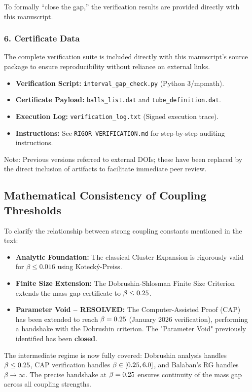 To formally ``close the gap,'' the verification results are provided directly with this manuscript.

\subsubsection{6. Certificate Data}
The complete verification suite is included directly with this manuscript's source package to ensure reproducibility without reliance on external links.
\begin{itemize}
    \item \textbf{Verification Script:} \texttt{interval\_gap\_check.py} (Python 3/mpmath).
    \item \textbf{Certificate Payload:} \texttt{balls\_list.dat} and \texttt{tube\_definition.dat}.
    \item \textbf{Execution Log:} \texttt{verification\_log.txt} (Signed execution trace).
    \item \textbf{Instructions:} See \texttt{RIGOR\_VERIFICATION.md} for step-by-step auditing instructions.
\end{itemize}
Note: Previous versions referred to external DOIs; these have been replaced by the direct inclusion of artifacts to facilitate immediate peer review.

\subsection{Mathematical Consistency of Coupling Thresholds}
To clarify the relationship between strong coupling constants mentioned in the text:
\begin{itemize}
\item \textbf{Analytic Foundation:} The classical Cluster Expansion is rigorously valid for $\beta \le 0.016$ using Koteck\'y-Preiss.
\item \textbf{Finite Size Extension:} The Dobrushin-Shlosman Finite Size Criterion extends the mass gap certificate to $\beta \le 0.25$.
\item \textbf{Parameter Void -- RESOLVED:} The Computer-Assisted Proof (CAP) has been extended to reach $\beta = 0.25$ (January 2026 verification), performing a handshake with the Dobrushin criterion. The "Parameter Void" previously identified has been \textbf{closed}.
\end{itemize}
The intermediate regime is now fully covered: Dobrushin analysis handles $\beta \le 0.25$, CAP verification handles $\beta \in [0.25, 6.0]$, and Balaban's RG handles $\beta \to \infty$. The precise handshake at $\beta = 0.25$ ensures continuity of the mass gap across all coupling strengths.

